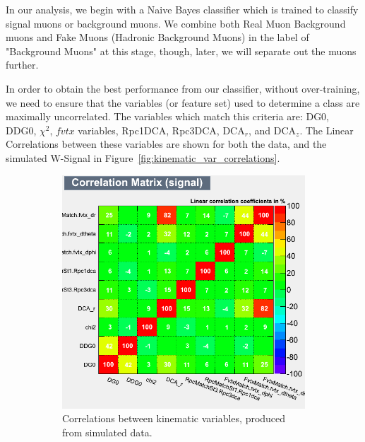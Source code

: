 In our analysis, we begin with a Naive Bayes classifier which is trained to
classify signal muons or background muons. We combine both Real Muon
Background muons and Fake Muons (Hadronic Background Muons) in the label of
"Background Muons" at this stage, though, later, we will separate out the muons
further.

In order to obtain the best performance from our classifier, without
over-training, we need to ensure that the variables (or feature set) used to
determine a class are maximally uncorrelated. The variables which match this
criteria are: DG0, DDG0, $\chi^2$, $fvtx$ variables, Rpc1DCA, Rpc3DCA, DCA$_r$,
and DCA$_z$. The Linear Correlations between these variables are shown for both
the data, and the simulated W-Signal in
Figure~\ref{fig:kinematic_var_correlations}.

\begin{figure}[H]
	\centering
	\begin{subfigure}[t]{0.5\textwidth}
		\centering
		\includegraphics[width=0.95\linewidth]{./figures/CorrelationMatrix_Signal.png}
		\caption{Correlations between kinematic variables, produced from simulated
			data.}
		\label{fig:corr_mat_sig}
	\end{subfigure}%
  \begin{subfigure}[t]{0.5\textwidth}
		\centering

\end{subfigure}
\end{figure}
